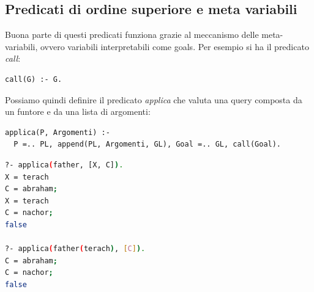 \documentclass[a4paper,12pt, oneside]{book}
\begin{document}
\subsection{Predicati di ordine superiore e meta variabili}
Buona parte di questi predicati funziona grazie al meccanismo
delle meta-variabili, ovvero variabili interpretabili come goals. Per esempio si ha il predicato \textit{call}:
\begin{verbatim}
call(G) :- G.
\end{verbatim}
Possiamo quindi definire il predicato \textit{applica }che valuta una query composta da un funtore e da una lista di argomenti:
\begin{verbatim}
applica(P, Argomenti) :-
  P =.. PL, append(PL, Argomenti, GL), Goal =.. GL, call(Goal).
\end{verbatim}
\begin{shaded}
\begin{lstlisting}[language=bash]
?- applica(father, [X, C]).
X = terach
C = abraham;
X = terach
C = nachor;
false

?- applica(father(terach), [C]).
C = abraham;
C = nachor;
false
\end{lstlisting}
\end{shaded}
\end{document}
